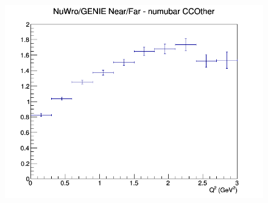 \documentclass[12pt]{article}
\begin{document}
\begin{figure}[h]
\endminipage
{}
\includegraphics[width=\linewidth]{Q2/nominal/ratios/CCOther_NuWro_GENIE_numubar_NF_Q2.png}
\endminipage
\newline
\end{figure}
\clearpage
\end{document}
